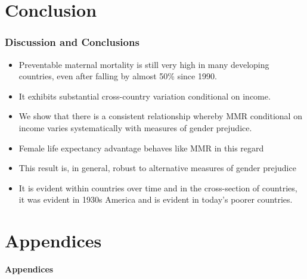 \documentclass[10pt,letterpaper,subeqn]{beamer}
\begin{document}
\section{Conclusion}
\begin{frame}
\frametitle{Discussion and Conclusions}
\begin{itemize}
\setlength{\itemsep}{12pt}
	\item Preventable maternal mortality is still very high in many developing 
        countries, even after falling by almost 50\% since 1990.
	\item It exhibits substantial cross-country variation conditional on income.
	\item We show that there is a consistent relationship whereby MMR conditional 
        on income varies systematically with measures of gender prejudice.
	\item Female life expectancy advantage behaves like MMR in this regard
	\item This result is, in general, robust to alternative measures of gender 
        prejudice
	\item It is evident within countries over time and in the cross-section of
        countries, it was evident in 1930s America and is evident in today's
        poorer countries.
\end{itemize}
\end{frame}




\section{Appendices}

\begin{frame}[plain]
\begin{center}
\textbf{Appendices}
\end{center}
\end{frame}
\end{document}
